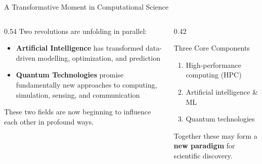 \documentclass[aspectratio=169]{beamer}
\begin{document}
\begin{frame}{A Transformative Moment in Computational Science}

  \begin{columns}[T]
    \begin{column}{0.54\textwidth}
      Two revolutions are unfolding in parallel:
      \medskip
      \begin{itemize}
        \item \textbf{Artificial Intelligence} has transformed data-driven
              modelling, optimization, and prediction
        \medskip
        \item \textbf{Quantum Technologies} promise fundamentally new
              approaches to computing, simulation, sensing, and communication
      \end{itemize}
      \bigskip
      \alert{These two fields are now beginning to influence each other
      in profound ways.}
    \end{column}
    \begin{column}{0.42\textwidth}
      \begin{block}{Three Core Components}
        \begin{enumerate}
          \item High-performance computing (HPC)
          \item Artificial intelligence \& ML
          \item Quantum technologies
        \end{enumerate}
      \end{block}
      \medskip
      \small Together these may form a \textbf{new paradigm} for
      scientific discovery.
    \end{column}
  \end{columns}
\end{frame}
\end{document}
